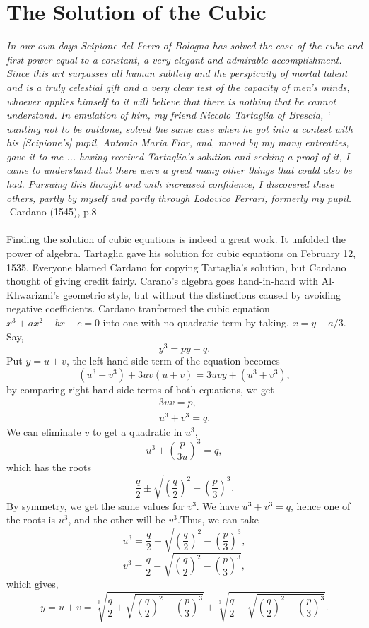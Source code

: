 \documentclass[a4paper,reqno,11pt]{book}
\theoremstyle{plain}%
\theoremstyle{definition}
\begin{document}
\section{The Solution of the Cubic}
\textit{In our own days Scipione del Ferro of Bologna has solved
the case of the cube and first power equal to a constant, a
very elegant and admirable accomplishment. Since this art
surpasses all human subtlety and the perspicuity of mortal
talent and is a truly celestial gift and a very clear test of the
capacity of men’s minds, whoever applies himself to it will
believe that there is nothing that he cannot understand. In
emulation of him, my friend Niccolo Tartaglia of Brescia, `
wanting not to be outdone, solved the same case when he got
into a contest with his [Scipione’s] pupil, Antonio Maria Fior,
and, moved by my many entreaties, gave it to me ... having
received Tartaglia’s solution and seeking a proof of it, I came
to understand that there were a great many other things that
could also be had. Pursuing this thought and with increased
confidence, I discovered these others, partly by myself and
partly through Lodovico Ferrari, formerly my pupil.}\cite{ref 2}\\
\vspace{2ex}
\hfill{-Cardano (1545), p.8}\\
\\
Finding the solution of cubic equations is indeed a great work. It unfolded the power of algebra. Tartaglia gave his solution for cubic equations on February 12, 1535. Everyone blamed Cardano for copying Tartaglia’s solution, but Cardano thought of giving credit fairly. Carano's algebra goes hand-in-hand with Al-Khwarizmi's geometric style, but without the distinctions caused by avoiding negative coefficients. Cardano tranformed the cubic equation $x^3+ax^2+bx+c = 0$ into one with no quadratic term by taking, $x = y - a/3.$ Say,\\
$$y^3 = py + q.$$
Put $y = u + v$, the left-hand side term of the equation becomes
$$(u^3 + v^3) + 3uv(u + v) = 3uvy + (u^3 + v^3),$$
by comparing right-hand side terms of both equations, we get
\begin{align*}
3uv = p,\\
u^3 + v^3 = q.
\end{align*}
We can eliminate $v$ to get a quadratic in $u^3$,\\
$$u^3 + \left(\frac{p}{3u}\right)^3 = q,$$
which has the roots\\
$$\frac{q}{2} \pm \sqrt{\left(\frac{q}{2}\right)^2 - \left(\frac{p}{3}\right)^3}.$$
By symmetry, we get the same values for $v^3$. We have $u^3 + v^3 = q$, hence
one of the roots is $u^3$, and the other will be $v^3$.Thus, we can take
$$u^3 = \frac{q}{2} + \sqrt{\left(\frac{q}{2}\right)^2 - \left(\frac{p}{3}\right)^3},$$
$$v^3 = \frac{q}{2} - \sqrt{\left(\frac{q}{2}\right)^2 - \left(\frac{p}{3}\right)^3},$$
which gives,\\
$$y = u+v = \sqrt[3]{\frac{q}{2} + \sqrt{\left(\frac{q}{2}\right)^2 - \left(\frac{p}{3}\right)^3}} + \sqrt[3]{\frac{q}{2} - \sqrt{\left(\frac{q}{2}\right)^2 - \left(\frac{p}{3}\right)^3}}.$$\\
\\
\end{document}
